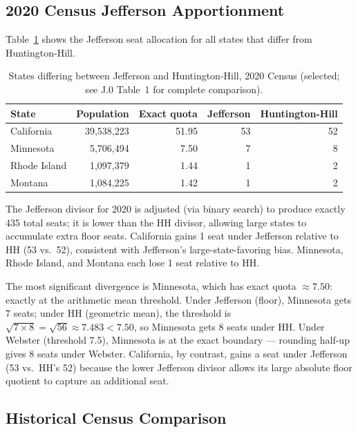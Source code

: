 \label{sec:empirical}

\subsection{2020 Census Jefferson Apportionment}

Table~\ref{tab:jefferson-2020} shows the Jefferson seat allocation
for all states that differ from Huntington-Hill.

\begin{table}[h]
\centering
\caption{States differing between Jefferson and Huntington-Hill,
  2020 Census (selected; see J.0 Table~1 for complete comparison).}
\label{tab:jefferson-2020}
\begin{tabular}{lrrrr}
\toprule
State & Population & Exact quota & Jefferson & Huntington-Hill \\
\midrule
California & 39,538,223 & 51.95 & 53 & 52 \\
Minnesota  & 5,706,494  & 7.50  &  7 &  8 \\
Rhode Island & 1,097,379 & 1.44 &  1 &  2 \\
Montana    & 1,084,225  & 1.42  &  1 &  2 \\
\bottomrule
\end{tabular}
\begin{tablenotes}
\small
\item The Jefferson divisor for 2020 is adjusted (via binary search)
  to produce exactly 435 total seats; it is lower than the HH divisor,
  allowing large states to accumulate extra floor seats.
  California gains 1 seat under Jefferson relative to HH (53 vs.\ 52),
  consistent with Jefferson's large-state-favoring bias.
  Minnesota, Rhode Island, and Montana each lose 1 seat relative to HH.
\end{tablenotes}
\end{table}

The most significant divergence is Minnesota, which has exact quota
$\approx 7.50$: exactly at the arithmetic mean threshold.
Under Jefferson (floor), Minnesota gets 7 seats; under HH (geometric mean),
the threshold is $\sqrt{7 \times 8} = \sqrt{56} \approx 7.483 < 7.50$,
so Minnesota gets 8 seats under HH.
Under Webster (threshold 7.5), Minnesota is at the exact boundary ---
rounding half-up gives 8 seats under Webster.
California, by contrast, gains a seat under Jefferson (53 vs.\ HH's 52)
because the lower Jefferson divisor allows its large absolute floor quotient
to capture an additional seat.

\subsection{Historical Census Comparison}

